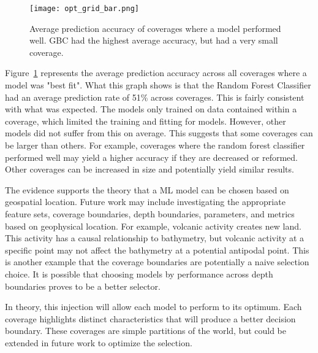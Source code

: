 \begin{figure}[htp]
    \centering
    \texttt{[image: opt\_grid\_bar.png]}
    \caption{Average prediction accuracy of coverages where a model performed well. 
    GBC had the highest average accuracy, but had a very small coverage.}
    \label{fig:grid_opt_graph}
\end{figure}

\par
Figure~\ref{fig:grid_opt_graph} represents the average prediction accuracy across all coverages where a model was "best fit".
What this graph shows is that the Random Forest Classifier had an average prediction rate of 51\% across coverages.
This is fairly consistent with what was expected. 
The models only trained on data contained within a coverage, which limited the training and fitting for models. 
However, other models did not suffer from this on average.
This suggests that some coverages can be larger than others.
For example, coverages where the random forest classifier performed well may yield a higher accuracy if they are decreased or reformed.
Other coverages can be increased in size and potentially yield similar results.


\par
The evidence supports the theory that a \ac{ML} model can be chosen based on geospatial location.
Future work may include investigating the appropriate feature sets, coverage boundaries, depth boundaries, parameters, and metrics based on geophysical location.
For example, volcanic activity creates new land.
This activity has a causal relationship to bathymetry, but volcanic activity at a specific point may not affect the bathymetry at a potential antipodal point.
This is another example that the coverage boundaries are potentially a naive selection choice.
It is possible that choosing models by performance across depth boundaries proves to be a better selector.
\par
In theory, this injection will allow each model to perform to its optimum.
Each coverage highlights distinct characteristics that will produce a better decision boundary.
These coverages are simple partitions of the world, but could be extended in future work to optimize the selection.



